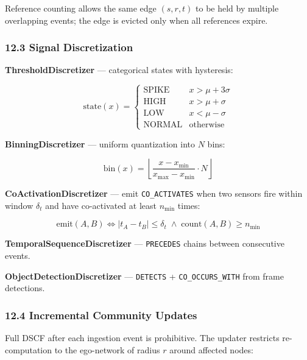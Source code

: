 \documentclass[10pt,journal,compsoc]{IEEEtran}
\begin{document}
Reference counting allows the same edge $(s, r, t)$ to be held by multiple
overlapping events; the edge is evicted only when all references expire.

\subsubsection{12.3 Signal Discre\-tization}

\textbf{ThresholdDiscre\-tizer} — categorical states with hysteresis:

\begin{equation}
\text{state}(x) = \begin{cases} \text{SPIKE} & x > \mu + 3\sigma \\ \text{HIGH} & x > \mu + \sigma \\ \text{LOW} & x < \mu - \sigma \\ \text{NORMAL} & \text{otherwise} \end{cases}
\end{equation}

\textbf{BinningDiscre\-tizer} — uniform quant\-ization into $N$ bins:

\begin{equation}
\text{bin}(x) = \left\lfloor \frac{x - x_{\min}}{x_{\max} - x_{\min}} \cdot N \right\rfloor
\end{equation}

\textbf{CoActivationDiscre\-tizer} — emit \texttt{CO\_ACTIVATES} when two sensors fire within
window $\delta_t$ and have co-activated at least $n_{\min}$ times:

\begin{equation}
\text{emit}(A,B) \iff |t_A - t_B| \leq \delta_t \;\wedge\; \text{count}(A,B) \geq n_{\min}
\end{equation}

\textbf{TemporalSequenceDiscre\-tizer} — \texttt{PRECEDES} chains between consecutive events.

\textbf{ObjectDetectionDiscre\-tizer} — \texttt{DETECTS} + \texttt{CO\_OCCURS\_WITH} from frame detections.

\subsubsection{12.4 Incremental Community Updates}

Full DSCF after each ingestion event is prohibitive. The updater restricts
re-computation to the ego-network of radius $r$ around affected nodes:
\end{document}

